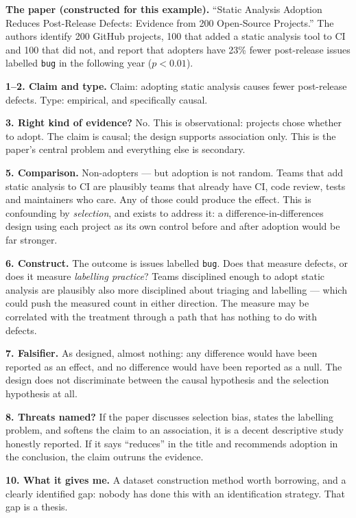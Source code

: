 \begin{worked}
\textbf{The paper (constructed for this example).} ``Static Analysis Adoption
Reduces Post-Release Defects: Evidence from 200 Open-Source Projects.'' The
authors identify 200 GitHub projects, 100 that added a static analysis tool to
CI and 100 that did not, and report that adopters have 23\% fewer post-release
issues labelled \texttt{bug} in the following year ($p < 0.01$).

\medskip
\textbf{1--2. Claim and type.} Claim: adopting static analysis causes fewer
post-release defects. Type: empirical, and specifically causal.

\medskip
\textbf{3. Right kind of evidence?} No. This is observational: projects chose
whether to adopt. The claim is causal; the design supports association only.
This is the paper's central problem and everything else is secondary.

\medskip
\textbf{5. Comparison.} Non-adopters --- but adoption is not random. Teams that
add static analysis to CI are plausibly teams that already have CI, code
review, tests and maintainers who care. Any of those could produce the effect.
This is confounding by \emph{selection}, and  exists to address
it: a difference-in-differences design using each project as its own control
before and after adoption would be far stronger.

\medskip
\textbf{6. Construct.} The outcome is issues labelled \texttt{bug}. Does that
measure defects, or does it measure \emph{labelling practice}? Teams
disciplined enough to adopt static analysis are plausibly also more disciplined
about triaging and labelling --- which could push the measured count in either
direction. The measure may be correlated with the treatment through a path that
has nothing to do with defects.

\medskip
\textbf{7. Falsifier.} As designed, almost nothing: any difference would have
been reported as an effect, and no difference would have been reported as a
null. The design does not discriminate between the causal hypothesis and the
selection hypothesis at all.

\medskip
\textbf{8. Threats named?} If the paper discusses selection bias, states the
labelling problem, and softens the claim to an association, it is a decent
descriptive study honestly reported. If it says ``reduces'' in the title and
recommends adoption in the conclusion, the claim outruns the evidence.

\medskip
\textbf{10. What it gives me.} A dataset construction method worth borrowing,
and a clearly identified gap: nobody has done this with an identification
strategy. That gap is a thesis.
\end{worked}

